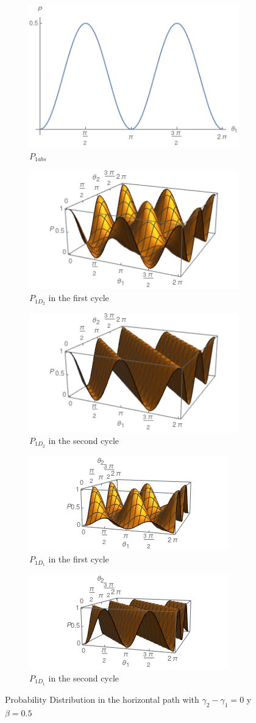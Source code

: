 \documentclass{book}
\begin{document}
\begin{figure}[h]
\centering
\begin{subfigure}[b]{0.40\linewidth}
\includegraphics[width=\linewidth,height=3 cm]{images/p1cabs.png}
\caption{$P_{1abs}$}
\label{fig:BS1}
\end{subfigure}
\begin{subfigure}[b]{0.40\linewidth}
\includegraphics[width=\linewidth,height=3 cm]{images/p1cd21.png}
\caption{$P_{1D_{2}}$ in the first cycle }
\label{fig:BS1}
\end{subfigure}
\begin{subfigure}[b]{0.40\linewidth}
\includegraphics[width=\linewidth,height=3 cm]{images/p1cd22.png}
\caption{$P_{1D_{2}}$ in the second cycle}
\label{fig:BS1}
\end{subfigure}
\begin{subfigure}[b]{0.40\linewidth}
\includegraphics[width=\linewidth,height=3 cm]{images/p1cd11.png}
\caption{$P_{1D_{1}} $ in the first cycle}
\label{fig:westminster_aerea}
\end{subfigure}
\begin{subfigure}[b]{0.40\linewidth}
\includegraphics[width=\linewidth,height=3 cm]{images/p1cd12.png}
\caption{$P_{1D_{1}} $ in the second cycle }
\label{fig:BS1}
\end{subfigure}
\caption{Probability Distribution in the horizontal path with  $\gamma_{2}-\gamma_{1}=0 $ y $\beta=0.5$}
\label{P3chopper}
\end{figure}
\end{document}
